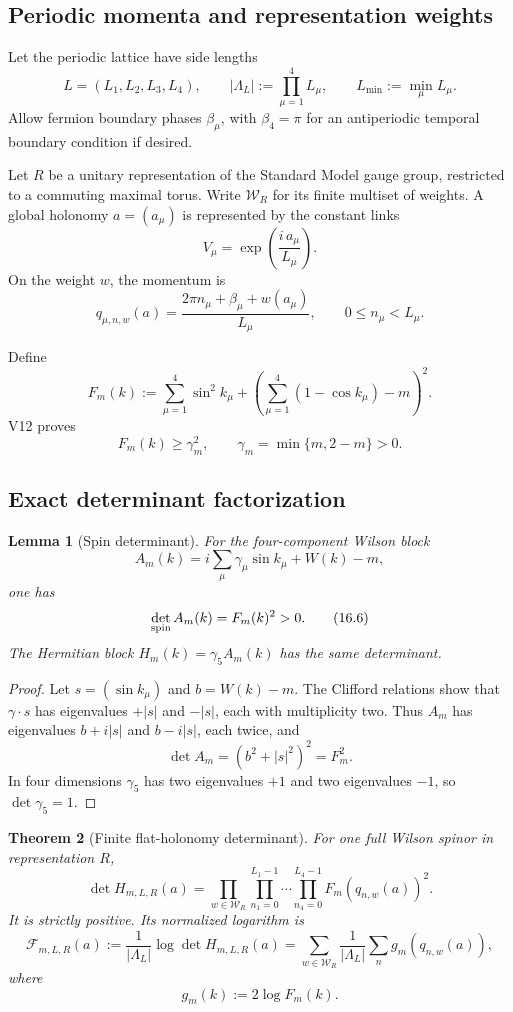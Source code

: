 \documentclass[11pt]{article}
\newtheorem{theorem}{Theorem}[section]
\newtheorem{lemma}[theorem]{Lemma}
\begin{document}
\subsection{Periodic momenta and representation weights}

Let the periodic lattice have side lengths
\[
 L=(L_1,L_2,L_3,L_4),\qquad
 |\Lambda_L|:=\prod_{\mu=1}^4L_\mu,
 \qquad
 L_{\min}:=\min_\mu L_\mu.
 \tag{16.1}
\]
Allow fermion boundary phases \(\beta_\mu\), with
\(\beta_4=\pi\) for an antiperiodic temporal boundary condition if
desired.

Let \(R\) be a unitary representation of the Standard Model gauge group,
restricted to a commuting maximal torus.  Write \(\mathcal W_R\) for its
finite multiset of weights.  A global holonomy \(a=(a_\mu)\) is represented
by the constant links
\[
 V_\mu=\exp\left(\frac{i\,a_\mu}{L_\mu}\right).
 \tag{16.2}
\]
On the weight \(w\), the momentum is
\[
 q_{\mu,n,w}(a)
 =
 \frac{2\pi n_\mu+\beta_\mu+w(a_\mu)}{L_\mu},
 \qquad
 0\leq n_\mu<L_\mu.
 \tag{16.3}
\]

Define
\[
 F_m(k)
 :=
 \sum_{\mu=1}^4\sin^2k_\mu+
 \left(\sum_{\mu=1}^4(1-\cos k_\mu)-m\right)^2.
 \tag{16.4}
\]
V12 proves
\[
 F_m(k)\geq\gamma_m^2,\qquad
 \gamma_m=\min\{m,2-m\}>0.
 \tag{16.5}
\]

\subsection{Exact determinant factorization}

\begin{lemma}[Spin determinant]
\label{lem:v11v16-spin}
For the four-component Wilson block
\[
 A_m(k)=i\sum_\mu\gamma_\mu\sin k_\mu+W(k)-m,
\]
one has
\[
 \det_{\rm spin}A_m(k)=F_m(k)^2>0.
 \tag{16.6}
\]
The Hermitian block \(H_m(k)=\gamma_5A_m(k)\) has the same determinant.
\end{lemma}

\begin{proof}
Let \(s=(\sin k_\mu)\) and \(b=W(k)-m\).  The Clifford relations show
that \(\gamma\cdot s\) has eigenvalues \(+|s|\) and \(-|s|\), each with
multiplicity two.  Thus \(A_m\) has eigenvalues
\(b+i|s|\) and \(b-i|s|\), each twice, and
\[
 \det A_m=(b^2+|s|^2)^2=F_m^2.
\]
In four dimensions \(\gamma_5\) has two eigenvalues \(+1\) and two
eigenvalues \(-1\), so \(\det\gamma_5=1\).
\end{proof}

\begin{theorem}[Finite flat-holonomy determinant]
\label{thm:v11v16-factorization}
For one full Wilson spinor in representation \(R\),
\[
 \det H_{m,L,R}(a)
 =
 \prod_{w\in\mathcal W_R}
 \prod_{n_1=0}^{L_1-1}\cdots\prod_{n_4=0}^{L_4-1}
 F_m(q_{n,w}(a))^2.
 \tag{16.7}
\]
It is strictly positive.  Its normalized logarithm is
\[
 \mathcal F_{m,L,R}(a)
 :=
 \frac1{|\Lambda_L|}\log\det H_{m,L,R}(a)
 =
 \sum_{w\in\mathcal W_R}
 \frac1{|\Lambda_L|}
 \sum_n g_m(q_{n,w}(a)),
 \tag{16.8}
\]
where
\[
 g_m(k):=2\log F_m(k).
 \tag{16.9}
\]
\end{theorem}
\end{document}
